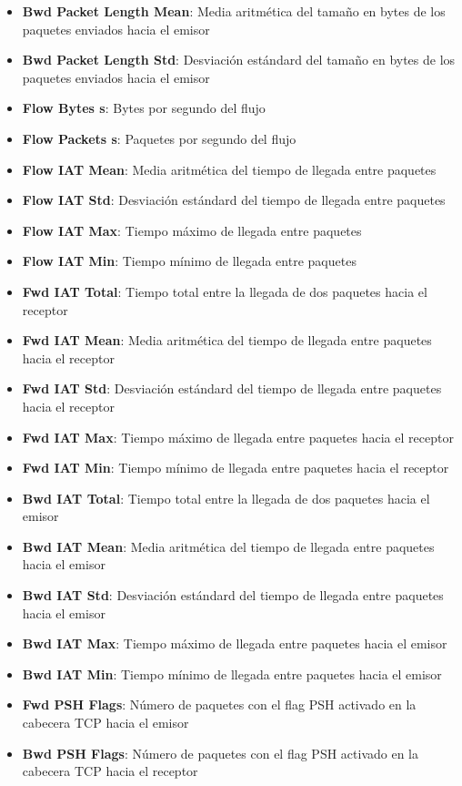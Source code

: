 \begin{itemize}
    \item \textbf{Bwd Packet Length Mean}: Media aritmética del tamaño en bytes de los paquetes enviados hacia el emisor
    \item \textbf{Bwd Packet Length Std}: Desviación estándard del tamaño en bytes de los paquetes enviados hacia el emisor
    \item \textbf{Flow Bytes s}: Bytes por segundo del flujo
    \item \textbf{Flow Packets s}: Paquetes por segundo del flujo
    \item \textbf{Flow IAT Mean}: Media aritmética del tiempo de llegada entre paquetes
    \item \textbf{Flow IAT Std}: Desviación estándard del tiempo de llegada entre paquetes
    \item \textbf{Flow IAT Max}: Tiempo máximo de llegada entre paquetes
    \item \textbf{Flow IAT Min}: Tiempo mínimo de llegada entre paquetes
    \item \textbf{Fwd IAT Total}: Tiempo total entre la llegada de dos paquetes hacia el receptor
    \item \textbf{Fwd IAT Mean}: Media aritmética del tiempo de llegada entre paquetes hacia el receptor
    \item \textbf{Fwd IAT Std}: Desviación estándard del tiempo de llegada entre paquetes hacia el receptor
    \item \textbf{Fwd IAT Max}: Tiempo máximo de llegada entre paquetes hacia el receptor
    \item \textbf{Fwd IAT Min}: Tiempo mínimo de llegada entre paquetes hacia el receptor
    \item \textbf{Bwd IAT Total}: Tiempo total entre la llegada de dos paquetes hacia el emisor
    \item \textbf{Bwd IAT Mean}: Media aritmética del tiempo de llegada entre paquetes hacia el emisor
    \item \textbf{Bwd IAT Std}: Desviación estándard del tiempo de llegada entre paquetes hacia el emisor
    \item \textbf{Bwd IAT Max}: Tiempo máximo de llegada entre paquetes hacia el emisor
    \item \textbf{Bwd IAT Min}: Tiempo mínimo de llegada entre paquetes hacia el emisor
    \item \textbf{Fwd PSH Flags}: Número de paquetes con el flag PSH activado en la cabecera TCP hacia el emisor
    \item \textbf{Bwd PSH Flags}: Número de paquetes con el flag PSH activado en la cabecera TCP hacia el receptor

\end{itemize}
